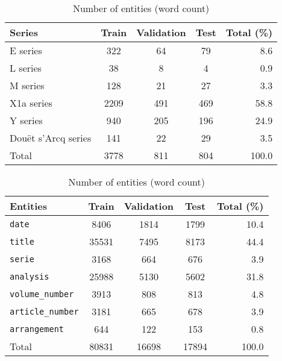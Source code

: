 \documentclass[runningheads]{llncs}
\begin{document}
\begin{table}[th]
    \centering
    \caption{Statistics for the \textit{Split-v3} split}
    \label{tab:splitv3}
    \begin{subtable}{0.7\linewidth}
        \centering
        \caption{Number of images for each series}
        \begin{tabular}{lcccr}
            \toprule
            \textbf{Series} & \textbf{Train} & \textbf{Validation} & \textbf{Test} & \textbf{Total (\%)} \\\midrule
            E series & 322 & 64 & 79 & 8.6 \\
            L series & 38 & 8 & 4 & 0.9 \\
            M series & 128 & 21 & 27 & 3.3 \\
            X1a series & 2209 & 491 & 469 & 58.8 \\
            Y series & 940 & 205 & 196 & 24.9\\
            Douët s'Arcq series & 141 & 22 & 29 & 3.5 \\
            \midrule
            Total & 3778 & 811 & 804 & 100.0\\
        \bottomrule
        \end{tabular}
    \end{subtable}
    \vfill
    \begin{subtable}{0.7\linewidth}
        \centering
        \caption{Number of entities (word count)}
        \begin{tabular}{lcccr}
            \toprule
            \textbf{Entities} & \textbf{Train} & \textbf{Validation} & \textbf{Test} & \textbf{Total (\%) }\\\midrule
            \texttt{date} & 8406 & 1814 & 1799 & 10.4 \\
            \texttt{title} & 35531 & 7495 & 8173 & 44.4 \\
            \texttt{serie} & 3168 & 664 & 676 & 3.9 \\
            \texttt{analysis} & 25988 & 5130 & 5602 & 31.8 \\
            \texttt{volume\_number} & 3913 & 808 & 813 & 4.8  \\
            \texttt{article\_number} & 3181 & 665 & 678 & 3.9 \\
            \texttt{arrangement} & 644 & 122 & 153 & 0.8\\
            \midrule
            Total & 80831 & 16698 & 17894 & 100.0\\
        \bottomrule
        \end{tabular}
    \end{subtable}
\end{table}
\end{document}
